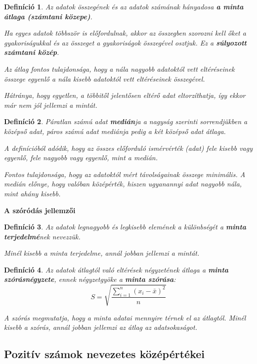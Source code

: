 \documentclass[12pt,a4paper]{article}
\newtheorem{definition}{Definíció} [section]
\begin{document}
\begin{definition}
Az adatok összegének és az adatok számának hányadosa \textbf{a minta átlaga (számtani közepe)}.

Ha egyes adatok többször is előfordulnak, akkor az összegben szorozni kell őket a gyakoriságukkal és az összeget a gyakoriságok összegével osztjuk. Ez a \textbf{súlyozott számtani közép}.

Az átlag fontos tulajdonsága, hogy a nála nagyobb adatoktól vett eltéréseinek összege
egyenlő a nála kisebb adatoktól vett eltéréseinek összegével.

Hátránya, hogy egyetlen, a többitől jelentősen eltérő adat eltorzíthatja, így ekkor már nem jól
jellemzi a mintát.
\end{definition}

\begin{definition}
Páratlan számú adat \textbf{medián}ja a nagyság szerinti sorrendjükben a középső adat, páros számú adat mediánja pedig a két középső adat átlaga.

A definícióból adódik, hogy az összes előforduló ismérvérték (adat) fele kisebb vagy egyenlő, fele nagyobb vagy egyenlő, mint a medián.

Fontos tulajdonsága, hogy az adatoktól mért távolságainak összege minimális.
A medián előnye, hogy valóban középérték, hiszen ugyanannyi adat nagyobb nála, mint ahány kisebb.
\end{definition}

\textbf{A szóródás jellemzői}


\begin{definition}
Az adatok legnagyobb és legkisebb elemének a különbségét a \textbf{minta terjedelmé}nek nevezzük.

Minél kisebb a minta terjedelme, annál jobban jellemzi a mintát.
\end{definition}

\begin{definition}
 Az adatok átlagtól való eltérések négyzetének átlaga a \textbf{minta szórásnégyzete}, ennek négyzetgyöke a \textbf{minta szórása}: \[S=\sqrt{\dfrac{\sum\limits_{i=1}^n(x_i-\bar{x})^2}{n}}\]

A szórás megmutatja, hogy a minta adatai mennyire térnek el az átlagtól. Minél kisebb a szórás, annál jobban jellemzi az átlag az adatsokaságot.
\end{definition}

\subsection{Pozitív számok nevezetes középértékei}
\end{document}
